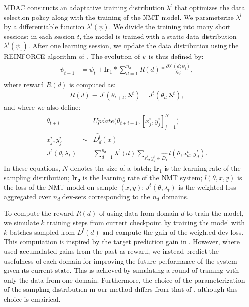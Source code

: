 \documentclass[11pt]{article}
\newcommand{\vlambda}{\ensuremath{\boldsymbol\lambda}\xspace} %
\begin{document}
MDAC constructs an adaptative training distribution $\lambda^{l}$ that optimizes the data selection policy along with the training of the NMT model. We parameterize $\lambda^{l}$ by a differentiable function $\lambda^l(\psi)$. We divide the training into many short sessions; in each session $t$, the model is trained with a static data distribution $\lambda^{l}(\psi_t)$. After one learning session, we update the data distribution using the REINFORCE algorithm of \citet{Williams92simple}. The evolution of $\psi$ is thus defined by:
\begin{align*}
\psi_{t+1} &= \psi_t + \mathbf{lr}_{1} * \displaystyle{\mathop{\sum}_{d=1}^{n_d}} R(d) * \frac{\partial \lambda^l(d;\psi_t)}{\partial \psi}, \\
\end{align*}
\begingroup
\allowdisplaybreaks
where reward $R(d)$ is computed as:
\begin{align*}
  R(d) = J^t(\theta_{t+k},\vlambda^t) - J^t(\theta_t,\vlambda^t),
\end{align*}
and where we also define:
\begin{equation}
\begin{array}{rcl}
\theta_{t+i} &=& Update\big(\theta_{t+i-1},[x^i_j,y^i_j]_{j=1}^N\big) \\ \nonumber
x^i_j, y^i_j &\sim& \widehat{D^l_d}(x) \\
J^t(\theta,\lambda_t) &=& \displaystyle{\mathop{\sum}_{d=1}^{n_d}}\lambda^t(d)\displaystyle{\mathop{\sum}_{x^t_d,y^t_d \in \widehat{D^t_d}}} l(\theta,x^t_d,y^t_d).
\end{array}
\end{equation}
\endgroup
In these equations, $N$ denotes the size of a batch; $\mathbf{lr}_{1}$ is the learning rate of the sampling distribution; $\mathbf{lr_2}$ is the learning rate of the NMT system; $l(\theta,x,y)$ is the loss of the NMT model on sample $(x,y)$; $J^t(\theta,\lambda_t)$ is the weighted loss aggregated over $n_d$ dev-sets corresponding to the $n_d$ domains.

To compute the reward $R(d)$ of using data from domain $d$ to train the model, we simulate $k$ training steps from current checkpoint by training the model with $k$ batches sampled from $D^l(d)$ and compute the gain of the weighted dev-loss. This computation is inspired by the target prediction gain in \citep{Graves17automated}. However, where \cite{Graves17automated} used accumulated gains from the past as reward, we instead predict the usefulness of each domain for improving the future performance of the system given its current state. This is achieved by simulating a round of training with only the data from one domain. Furthermore, the choice of the parameterization of the sampling distribution in our method differs from that of \citet{Graves17automated}, although this choice is empirical.
\end{document}
